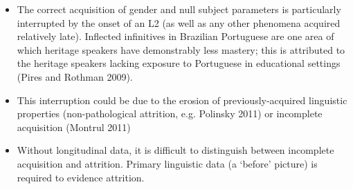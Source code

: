 \documentclass{article}
\begin{document}
\begin{itemize}
    \item The correct acquisition of gender and null subject parameters is particularly interrupted by the onset of an L2 (as well as any other phenomena acquired relatively late). Inflected infinitives in Brazilian Portuguese are one area of which heritage speakers have demonstrably less mastery; this is attributed to the heritage speakers lacking exposure to Portuguese in educational settings (Pires and Rothman 2009).
    \item This interruption could be due to the erosion of previously-acquired linguistic properties (non-pathological attrition, e.g. Polinsky 2011) or incomplete acquisition (Montrul 2011)
    \item Without longitudinal data, it is difficult to distinguish between incomplete acquisition and attrition. Primary linguistic data (a `before' picture) is required to evidence attrition.
\end{itemize}
\end{document}
